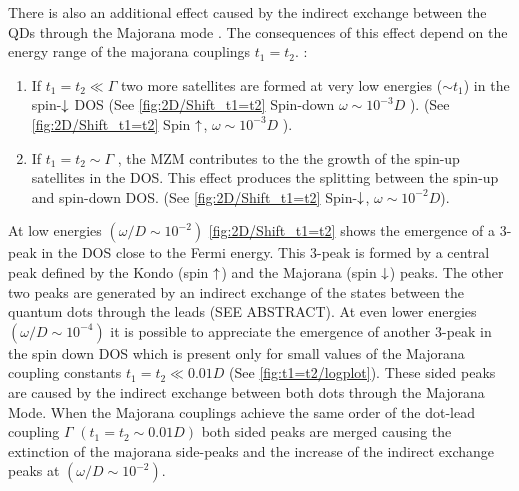There is also an additional effect caused by the indirect exchange between the QDs through the Majorana mode . The consequences of this effect depend on the energy range of the majorana couplings $t_1=t_2$.  : 
\begin{enumerate}
    \item If $t_1=t_2 \ll \Gamma $ two more satellites are formed at very low energies ($\sim t_1$) in the spin-$\downarrow$ DOS (See  \ref{fig:2D/Shift_t1=t2} Spin-down $\omega \sim 10^{-3}D$ ). (See  \ref{fig:2D/Shift_t1=t2} Spin $\uparrow$, $\omega \sim 10^{-3}D$ ).
    \item If $t_1=t_2 \sim \Gamma$ , the MZM contributes to the the growth of the spin-up satellites in the DOS. This effect produces the splitting between the spin-up and spin-down DOS.   (See  \ref{fig:2D/Shift_t1=t2} Spin-$\downarrow$, $\omega \sim 10^{-2}D$).
\end{enumerate}








\iffalse
At low energies $(\omega/D \sim 10^{-2})$ \ref{fig:2D/Shift_t1=t2} shows the emergence of a 3-peak in the DOS close to the Fermi energy. This 3-peak is formed by a central peak defined by the Kondo (spin $\uparrow$) and the Majorana (spin $\downarrow$) peaks. The other two peaks are generated by an indirect exchange of the states between the quantum dots through the leads (SEE ABSTRACT). At even lower energies $(\omega/D \sim 10^{-4})$ it is possible to appreciate the emergence of another 3-peak in the spin down DOS which is present only for small values of the Majorana coupling constants $t_1 = t_2 \ll 0.01D$ (See  \ref{fig:t1=t2/logplot}). These sided peaks are caused by the indirect exchange between both dots through the Majorana Mode. When the Majorana couplings achieve the same order of the dot-lead coupling $\Gamma$ $(t_1 = t_2 \sim  0.01D)$ both sided peaks are merged causing the extinction of the majorana side-peaks and the increase of the indirect exchange peaks at $(\omega/D \sim 10^{-2})$. 

